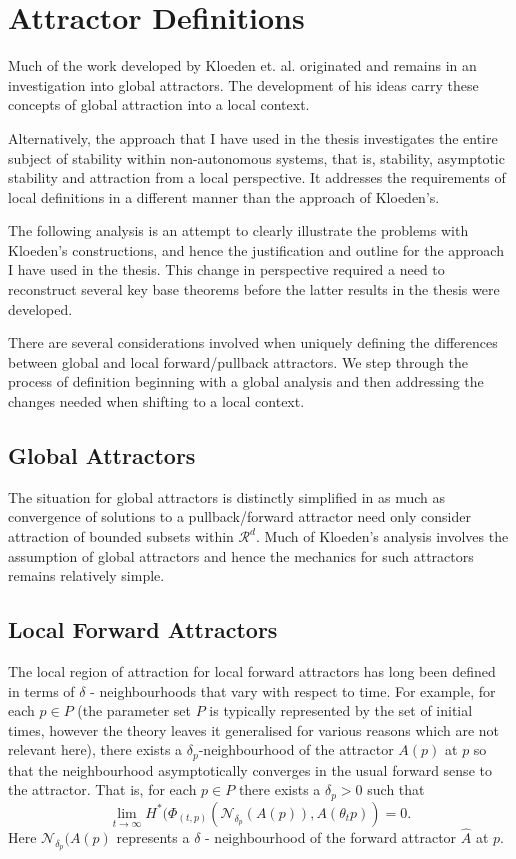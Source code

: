 \documentclass{article}
\begin{document}
\section{Attractor Definitions}

Much of the work developed by Kloeden et. al. originated and
remains in an investigation into global attractors. The development of his ideas
carry these concepts of global attraction into a local context.

Alternatively, the approach that I have used in the thesis
investigates the entire subject of stability within non-autonomous
systems, that is, stability, asymptotic stability and attraction
from a local perspective. It addresses the requirements of local
definitions in a different manner than the approach of Kloeden's.

The following analysis is an attempt to clearly illustrate the
problems with Kloeden's constructions, and hence the justification
and outline for the approach I have used in the thesis. This
change in perspective required a need to reconstruct several key
base theorems before the latter results in the thesis were
developed.

There are several considerations involved when uniquely defining the
differences between global and local forward/pullback attractors. We step
through the process of definition beginning with a global analysis and then
addressing the changes needed when shifting to a local context.

\subsection{Global Attractors}

The situation for global attractors is distinctly simplified in as much as
convergence of solutions to a pullback/forward attractor need only consider
attraction of bounded subsets within $\mathcal{R}^d$. Much of  Kloeden's
analysis involves the assumption of global attractors and hence the mechanics
for such attractors remains relatively simple.

\subsection{Local Forward Attractors}

The local region of attraction for local forward attractors has
long been defined in terms of $\delta$ - neighbourhoods that vary
with respect to time. For example, for each $p \in P$ (the
parameter set $P$ is typically represented by the set of initial
times, however the theory leaves it generalised for various
reasons which are not relevant here), there exists a
$\delta_p$-neighbourhood of the attractor $A(p)$ at $p$ so that
the neighbourhood asymptotically converges in the usual forward
sense to the attractor. That is, for each $p \in P$ there exists a
$\delta_p > 0$ such that
\[ \lim_{t \to \infty} H^*( \Phi_{(t, p)}(\mathcal{N}_{\delta_p}(A(p)),
   A(\theta_t p)) = 0. \]
Here $\mathcal{N}_{\delta_p}(A(p)$ represents a $\delta$ -
neighbourhood of the forward attractor $\hat{A}$ at $p$.
\end{document}
